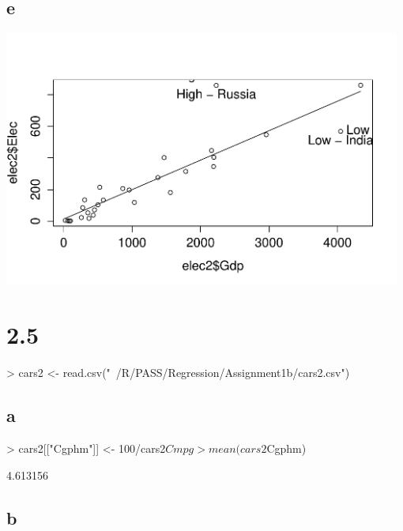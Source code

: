 \documentclass{article}
\begin{document}
\subsection*{e}
\includegraphics[width=0.98\textwidth]{HighLow.pdf}

\section*{2.5}
\begin{Schunk}
\begin{Sinput}
> cars2 <- read.csv("~/R/PASS/Regression/Assignment1b/cars2.csv")
\end{Sinput}
\end{Schunk}

\subsection*{a}
\begin{Schunk}
\begin{Sinput}
> cars2[["Cgphm"]] <- 100/cars2$Cmpg
> mean(cars2$Cgphm)
\end{Sinput}
\begin{Soutput}
[1] 4.613156
\end{Soutput}
\end{Schunk}

\subsection*{b}
\end{document}
